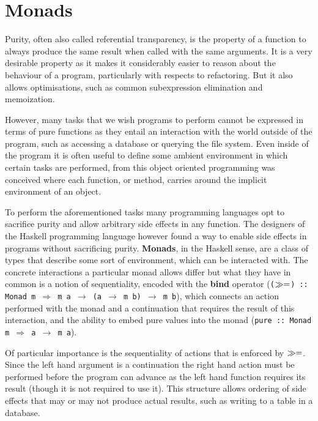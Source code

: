 \section{Monads}

\label{sec:monads}

Purity, often also called referential transparency, is the property of
a function to always produce the same result when called with the same
arguments. It is a very desirable property as it makes it considerably
easier to reason about the behaviour of a program, particularly with
respects to refactoring. But it also allows optimisations, such as
common subexpression elimination and memoization.

However, many tasks that we wish programs to perform cannot be
expressed in terms of pure functions as they entail an interaction
with the world outside of the program, such as accessing a database or
querying the file system. Even inside of the program it is often
useful to define some ambient environment in which certain tasks are
performed, from this object oriented programming was conceived where
each function, or method, carries around the implicit environment of
an object.

To perform the aforementioned tasks many programming languages opt to
sacrifice purity and allow arbitrary side effects in any function. The
designers of the Haskell programming language however found a way to
enable side effects in programs without sacrificing purity.
\textbf{Monads}, in the Haskell sense, are a class of types that
describe some sort of environment, which can be interacted with. The
concrete interactions a particular monad allows differ but what they
have in common is a notion of sequentiality, encoded with the
\textbf{bind} operator (\texttt{($\gg=$) :: Monad m $\Rightarrow$ m
  a $\rightarrow$ (a $\rightarrow$ m b) $\rightarrow$ m b}), which
connects an action performed with the monad and a continuation that
requires the result of this interaction, and the ability to embed pure
values into the monad (\texttt{pure :: Monad m $\Rightarrow$ a
  $\rightarrow$ m a}).

Of particular importance is the sequentiality of actions that is
enforced by $\gg=$. Since the left hand argument is a continuation
the right hand action must be performed before the program can advance
as the left hand function requires its result (though it is not
required to use it). This structure allows ordering of side effects
that may or may not produce actual results, such as writing to a table
in a database.

